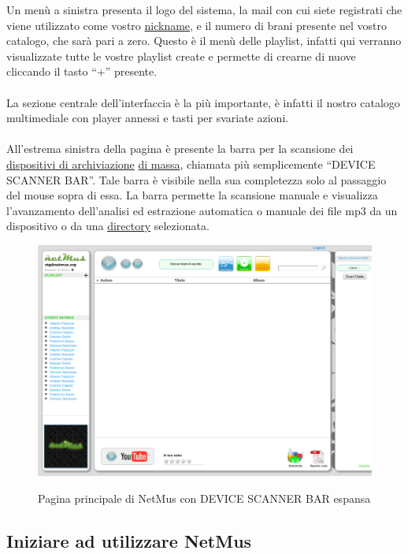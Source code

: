 Un men\`u a sinistra presenta il logo del sistema, la mail con cui siete
registrati che viene utilizzato come vostro \underline{nickname}, e il numero di
brani presente nel vostro catalogo, che sar\`a pari a zero. Questo \`e il men\`u
delle playlist, infatti qui verranno visualizzate tutte le vostre playlist
create e permette di crearne di nuove cliccando il tasto ``+'' presente.\\
\\
La sezione centrale dell'interfaccia \`e la pi\`u importante, \`e infatti il
nostro catalogo multimediale con player annessi e tasti per svariate azioni.\\
\\
All'estrema sinistra della pagina \`e presente la barra per la scansione
dei \underline{dispositivi di archiviazione} \underline{di massa}, chiamata
pi\`u semplicemente ``DEVICE SCANNER BAR''. Tale barra \`e visibile nella sua
completezza solo al passaggio del mouse sopra di essa. La barra permette la
scansione manuale e visualizza l'avanzamento dell'analisi ed estrazione
automatica o manuale dei file mp3 da un dispositivo o da una \underline{directory}
selezionata.\\
\begin{figure}[htbp]
  \centering
  \includegraphics[width=15cm]{img/MU/applet_bar_open.png}\\
\caption{Pagina principale di NetMus con DEVICE SCANNER BAR espansa}
\end{figure} 


\newpage
\subsection{Iniziare ad utilizzare NetMus}

